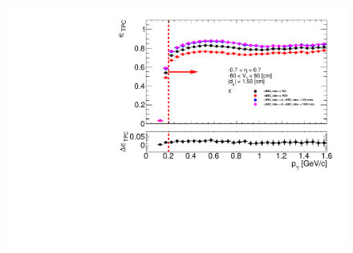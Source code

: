 \begin{figure}[hb]
{		\includegraphics[width=\linewidth,page=2]{graphics/systematicsEfficiency/bbc_and/tpcEffi_d0_1_5_etapt_1.pdf}\\
	}%
\end{figure}
